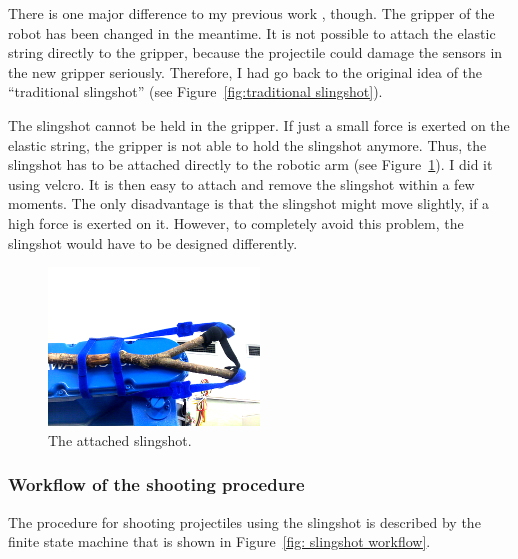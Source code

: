 There is one major difference to my previous work \cite{PreDiplomaLejsekHlavac}, though. The gripper of the \CloPeMa\/ robot has been changed in the meantime. It is not possible to attach the elastic string directly to the gripper, because the projectile could damage the sensors in the new gripper seriously. Therefore, I had go back to the original idea of the ``traditional slingshot'' (see Figure~\ref{fig:traditional slingshot}).

The slingshot cannot be held in the gripper. If just a small force is exerted on the elastic string, the gripper is not able to hold the slingshot anymore. Thus, the slingshot has to be attached directly to the robotic arm (see Figure~\ref{fig:attached slingshot}). I did it using velcro. It is then easy to attach and remove the slingshot within a few moments. The only disadvantage is that the slingshot might move slightly, if a high force is exerted on it. However, to completely avoid this problem, the slingshot would have to be designed differently.

			\begin{figure}[h]
			\includegraphics[width=0.5\textwidth]{attached_slingshotAdj.png}			
			\centering
			\caption{The attached slingshot.}
			\label{fig:attached slingshot}
			\end{figure}		
	
	
		\subsubsection{Workflow of the shooting procedure} \label{subsec: traditional workflow}
The procedure for shooting projectiles using the slingshot is described by the finite state machine that is shown in Figure~\ref{fig: slingshot workflow}.
			
